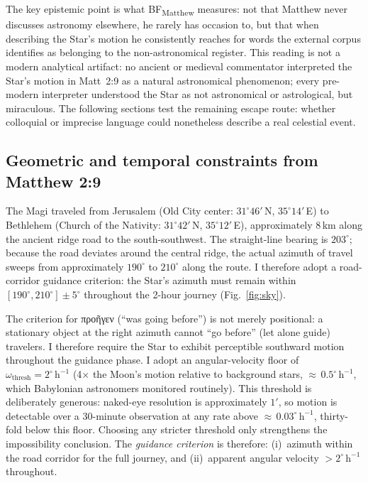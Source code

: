 \documentclass[sn-nature]{sn-jnl}
\newcommand{\grk}[1]{{\fontencoding{LGR}\selectfont #1}}
\newcommand{\grk}[1]{{\greekfont #1}}
\begin{document}
The key epistemic point is what BF\textsubscript{Matthew} measures: not that Matthew never
discusses astronomy elsewhere, he rarely has occasion to, but that when
describing the Star's motion he consistently reaches for words the external
corpus identifies as belonging to the non-astronomical register. This reading
is not a modern analytical artifact: no ancient or medieval commentator
interpreted the Star's motion in Matt~2:9 as a natural astronomical
phenomenon\cite{adair2012}; every pre-modern interpreter understood the Star
as not astronomical or astrological, but miraculous. The
following sections test the remaining escape route: whether colloquial or
imprecise language could nonetheless describe a real celestial event.

\subsection{Geometric and temporal constraints from Matthew 2:9}
\label{subsec:constraints}

The Magi traveled from Jerusalem (Old City center: $31^\circ 46'$\,N,
$35^\circ 14'$\,E) to Bethlehem (Church of the Nativity: $31^\circ 42'$\,N,
$35^\circ 12'$\,E), approximately 8\,km along the ancient ridge road to the
south-southwest. The straight-line bearing is $203^\circ$; because the road
deviates around the central ridge, the actual azimuth of travel sweeps from
approximately $190^\circ$ to $210^\circ$ along the route. I therefore adopt a
road-corridor guidance criterion: the Star's azimuth must remain within
$[190^\circ, 210^\circ] \pm 5^\circ$ throughout the 2-hour journey
(Fig.~\ref{fig:sky}).

The criterion for \grk{προῆγεν} (``was going before'') is not merely
positional: a stationary object at the right azimuth cannot ``go before'' 
(let alone guide) travelers\cite{adair2013star}.
I therefore require the Star to exhibit perceptible southward motion throughout
the guidance phase. I adopt an angular-velocity floor of
$\omega_\mathrm{thresh} = 2^\circ\,\mathrm{h}^{-1}$ (4$\times$ the Moon's
motion relative to background stars, ${\approx}\,0.5^\circ\,\mathrm{h}^{-1}$,
which Babylonian astronomers monitored routinely). This threshold is
deliberately generous: naked-eye resolution is approximately $1'$, so motion
is detectable over a 30-minute observation at any rate above
${\approx}\,0.03^\circ\,\mathrm{h}^{-1}$, thirty-fold below this floor.
Choosing any stricter threshold only strengthens the impossibility conclusion.
The \textit{guidance criterion} is therefore: (i)~azimuth within the road
corridor for the full journey, and (ii)~apparent angular velocity
$> 2^\circ\,\mathrm{h}^{-1}$ throughout.
\end{document}
